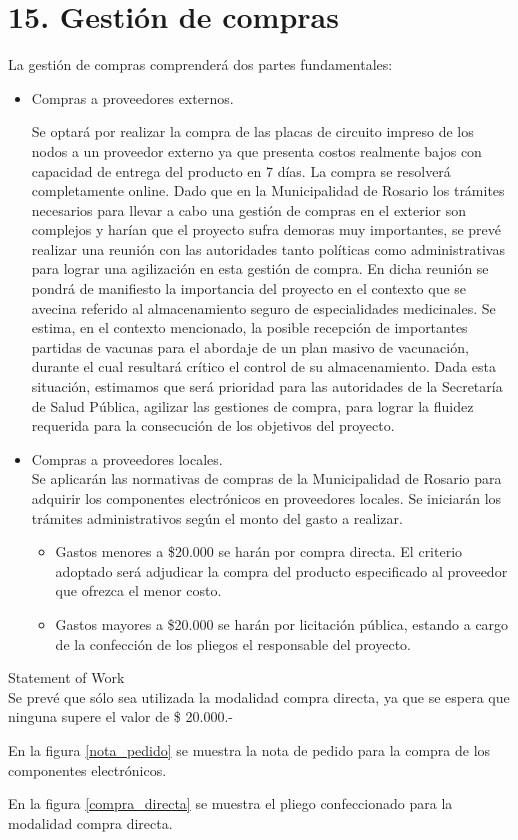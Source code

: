 \section{15. Gestión de compras}
\label{sec:compras}

La gestión de compras comprenderá dos partes fundamentales:
\begin{itemize}
\item Compras a proveedores externos.

Se optará por realizar la compra de las placas de circuito impreso de los nodos a un proveedor externo ya que presenta costos realmente bajos con capacidad de entrega del producto en 7 días. La compra se resolverá completamente online.
Dado que en la Municipalidad de Rosario los trámites necesarios para llevar a cabo una gestión de compras en el exterior son complejos y harían que el proyecto sufra demoras muy importantes, se prevé realizar una reunión con las autoridades tanto políticas como administrativas para lograr una agilización en esta gestión de compra. En dicha reunión se pondrá de manifiesto la importancia del proyecto en el contexto que se avecina referido al almacenamiento seguro de especialidades medicinales.
Se estima, en el contexto mencionado, la posible recepción de importantes partidas de vacunas para el abordaje de un plan masivo de vacunación, durante el cual resultará crítico el control de su almacenamiento.
Dada esta situación, estimamos que será prioridad para las autoridades de la Secretaría de Salud Pública, agilizar las gestiones de compra, para lograr la fluidez requerida para la consecución de los objetivos del proyecto.

\item Compras a proveedores locales.\\
Se aplicarán las normativas de compras de la Municipalidad de Rosario para adquirir los componentes electrónicos en proveedores locales. Se iniciarán los trámites administrativos según el monto del gasto a realizar.
\begin{itemize}
\item Gastos menores a \$20.000 se harán por compra directa. El criterio adoptado será adjudicar la compra del producto especificado al proveedor que ofrezca el menor costo.
\item Gastos mayores a \$20.000 se harán por licitación pública, estando a cargo de la confección de los pliegos el responsable del proyecto. 
\end{itemize}
\end{itemize}

Statement of Work\\
Se prevé que sólo sea utilizada la modalidad compra directa, ya que se espera que ninguna supere el valor de \$ 20.000.-

En la figura \ref{nota_pedido} se muestra la nota de pedido para la compra de los componentes electrónicos.

En la figura \ref{compra_directa} se muestra el pliego confeccionado para la modalidad compra directa.